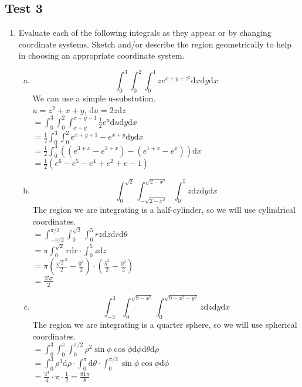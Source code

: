 \subsection{Test 3}
\begin{enumerate}
	\item Evaluate each of the following integrals as they appear or by changing coordinate systems. Sketch and/or describe the region geometrically to help in choosing an appropriate coordinate system.
	\begin{enumerate}[a.]
		\item $$\int_{0}^{3}{\int_{0}^{2}{\int_{0}^{1}{ze^{x+y+z^2}\mathrm{d}x}\mathrm{d}y}\mathrm{d}x}$$
		\indent
		We can use a simple u-substution.\\
		$u=z^2+x+y$, $\mathrm{d}u=2z\mathrm{d}z$\\
		$=\int_{0}^{3}{\int_{0}^{2}{\int_{x+y}^{x+y+1}{\frac{1}{2}e^{u}\mathrm{d}u}\mathrm{d}y}\mathrm{d}x}$\\
		$=\frac{1}{2}\int_{0}^{3}{\int_{0}^{2}{e^{x+y+1}-e^{x+y}\mathrm{d}y}\mathrm{d}x}$\\
		$=\frac{1}{2}\int_{0}^{3}{\left((e^{3+x}-e^{2+x})-(e^{1+x}-e^{x})\right)\mathrm{d}x}$\\
		$=\frac{1}{2}(e^6-e^5-e^4+e^2+e-1)$\\
		
		\item $$\int_{0}^{\sqrt{2}}{\int_{-\sqrt{2-x^2}}^{\sqrt{2-x^2}}{\int_{0}^{5}{z\mathrm{d}z}\mathrm{d}y}\mathrm{d}x}$$
		\indent
		The region we are integrating is a half-cylinder, so we will use cylindrical coordinates.\\
		$=\int_{-\pi/2}^{\pi/2}{\int_{0}^{\sqrt{2}}{\int_{0}^{5}{rz\mathrm{d}z}\mathrm{d}r}\mathrm{d}\theta}$\\
		$=\pi\int_{0}^{\sqrt{2}}{r\mathrm{d}r}\cdot\int_{0}^{5}{z\mathrm{d}z}$\\
		$=\pi\left(\frac{\sqrt{2}^{2}}{2}-\frac{0^2}{2}\right)\cdot\left(\frac{5^2}{2}-\frac{0^2}{2}\right)$\\
		$=\frac{25\pi}{2}$\\
		
		\item $$\int_{-3}^{3}{\int_{0}^{\sqrt{9-x^2}}{\int_{0}^{\sqrt{9-x^2-y^2}}{z\mathrm{d}z}\mathrm{d}y}\mathrm{d}x}$$
		\indent
		The region we are integrating is a quarter sphere, so we will use spherical coordinates.\\
		$=\int_{0}^{3}{\int_{0}^{\pi}{\int_{0}^{\pi/2}{\rho^2\sin{\phi}\cos{\phi}\mathrm{d}\phi}\mathrm{d}\theta}\mathrm{d}\rho}$\\
		$=\int_{0}^{3}{\rho^3\mathrm{d}\rho}\cdot\int_{0}^{\pi}{\mathrm{d}\theta}\cdot\int_{0}^{\pi/2}{\sin{\phi}\cos{\phi}\mathrm{d}\phi}$\\
		$=\frac{3^4}{4}\cdot\pi\cdot\frac{1}{2}=\frac{81\pi}{8}$\\
	\end{enumerate}
	

\end{enumerate}
